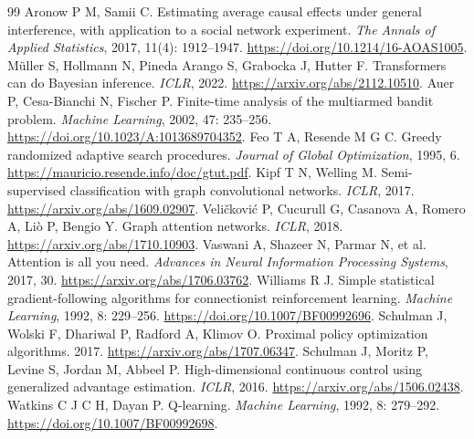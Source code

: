 \documentclass[a4paper,11pt]{article}
\numberwithin{equation}{section}
\begin{document}
\clearpage
\begin{thebibliography}{99}
Aronow P M, Samii C. Estimating average causal effects under general interference, with application to a social network experiment. \emph{The Annals of Applied Statistics}, 2017, 11(4): 1912--1947. \url{https://doi.org/10.1214/16-AOAS1005}.
Müller S, Hollmann N, Pineda Arango S, Grabocka J, Hutter F. Transformers can do Bayesian inference. \emph{ICLR}, 2022. \url{https://arxiv.org/abs/2112.10510}.
Auer P, Cesa-Bianchi N, Fischer P. Finite-time analysis of the multiarmed bandit problem. \emph{Machine Learning}, 2002, 47: 235--256. \url{https://doi.org/10.1023/A:1013689704352}.
Feo T A, Resende M G C. Greedy randomized adaptive search procedures. \emph{Journal of Global Optimization}, 1995, 6. \url{https://mauricio.resende.info/doc/gtut.pdf}.
Kipf T N, Welling M. Semi-supervised classification with graph convolutional networks. \emph{ICLR}, 2017. \url{https://arxiv.org/abs/1609.02907}.
Veličković P, Cucurull G, Casanova A, Romero A, Liò P, Bengio Y. Graph attention networks. \emph{ICLR}, 2018. \url{https://arxiv.org/abs/1710.10903}.
Vaswani A, Shazeer N, Parmar N, et al. Attention is all you need. \emph{Advances in Neural Information Processing Systems}, 2017, 30. \url{https://arxiv.org/abs/1706.03762}.
Williams R J. Simple statistical gradient-following algorithms for connectionist reinforcement learning. \emph{Machine Learning}, 1992, 8: 229--256. \url{https://doi.org/10.1007/BF00992696}.
Schulman J, Wolski F, Dhariwal P, Radford A, Klimov O. Proximal policy optimization algorithms. 2017. \url{https://arxiv.org/abs/1707.06347}.
Schulman J, Moritz P, Levine S, Jordan M, Abbeel P. High-dimensional continuous control using generalized advantage estimation. \emph{ICLR}, 2016. \url{https://arxiv.org/abs/1506.02438}.
Watkins C J C H, Dayan P. Q-learning. \emph{Machine Learning}, 1992, 8: 279--292. \url{https://doi.org/10.1007/BF00992698}.
\end{thebibliography}
\end{document}
